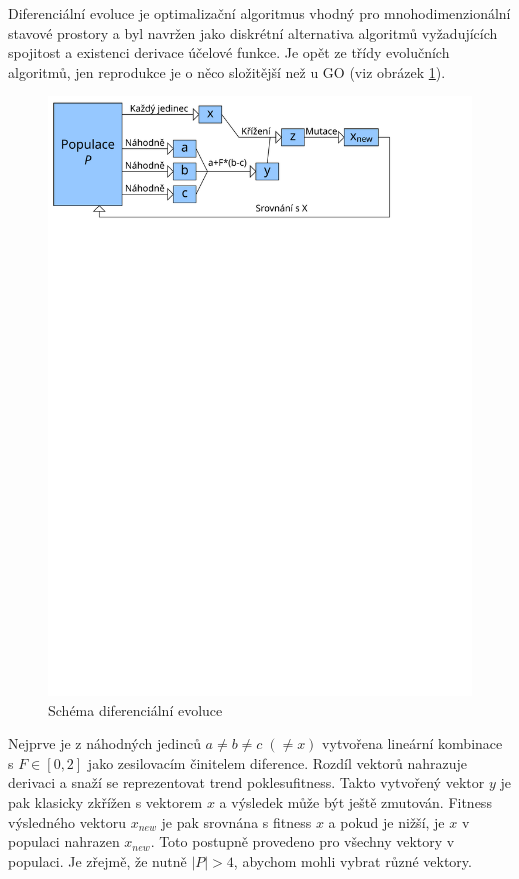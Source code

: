Diferenciální evoluce \cite{DE Storn} je optimalizační algoritmus vhodný pro mnohodimenzionální stavové prostory a byl navržen jako diskrétní alternativa algoritmů vyžadujících spojitost a existenci derivace účelové funkce. Je opět ze třídy evolučních algoritmů, jen reprodukce je o něco složitější než u GO (viz obrázek \ref{DE fig}).

\begin{figure}[h!]
  \includegraphics[width=\textwidth]{img/DE}
  \caption{Schéma diferenciální evoluce}\label{DE fig}
\end{figure}

Nejprve je z náhodných jedinců $a \ne b \ne c \; (\ne x)$ vytvořena lineární kombinace s \linebreak $F \in [0,2]$ jako zesilovacím činitelem diference. Rozdíl vektorů nahrazuje derivaci a snaží se reprezentovat \bq trend poklesu\eq   fitness. Takto vytvořený vektor $y$ je pak klasicky zkřížen s vektorem $x$ a výsledek může být ještě zmutován. Fitness výsledného vektoru $x_{new}$ je pak srovnána s fitness $x$ a pokud je nižší, je $x$ v populaci nahrazen $x_{new}$. Toto postupně provedeno pro všechny vektory v populaci. Je zřejmě, že nutně $|P| > 4$, abychom mohli vybrat různé vektory.

